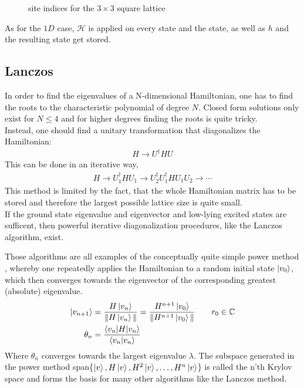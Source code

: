 \documentclass[a4paper,12pt]{article}
\begin{document}
\begin{figure}[htbp]
\centering
{}
\caption[]{\label{fig:1} site indices for the $3 \times 3$ square lattice}
\end{figure}
As for the $1D$ case, $\mathcal{H}$ is applied on every state and the
state, as well as $h$ and the resulting state get stored.



\subsection{Lanczos}

In order to find the eigenvalues of a N-dimensional Hamiltonian, one
has to find the roots to the characteristic polynomial of degree
$N$. Closed form solutions only exist for $ N\leq 4$ and for higher degrees
finding the roots is quite tricky.\\
Instead, one should find a unitary transformation that diagonalizes
the Hamiltonian:
\begin{align*}
H \to U^{\dagger} H U
\end{align*}
This can be done in an iterative way,
\begin{align*}
H \to U_1^{\dagger} H U_1 \to U_2^{\dagger}U_1^{\dagger} H U_1U_2 \to \dotsm
\end{align*}
This method is limited by the fact, that the whole Hamiltonian matrix
has to be stored and therefore the largest possible lattice size is
quite small.\\
If the ground state eigenvalue and eigenvector and low-lying excited
states are sufficent, then powerful iterative diagonalization
procedures, like the Lanczos algorithm, exist.

Those algorithms are all examples of the conceptually quite simple
power method \cite{Noack},
whereby one repeatedly applies the Hamiltonian to a random initial
state $\ket{v_0}$, which then converges towards the eigenvector of the
corresponding greatest (absolute) eigenvalue.
\begin{align*}
\ket{v_{n+1}} &= \frac{H \ket{v_n}}{\| H \ket{v_n} \|} =\frac{H^{n+1} \ket{v_0}}{\| H^{n+1} \ket{v_0} \|}  \qquad r_0 \in \mathbb{C}\\
\theta_n &= \frac{\braket{v_n|H|v_n}}{\braket{v_n|v_n}}
\end{align*}
Where $\theta_n$ converges towards the largest eigenvalue $\lambda$. The
subspace generated in the power method
 span\{$\ket{v},H \ket{v}, H^2 \ket{v}, \dotsc,H^n \ket{v}$\} 
is called the n'th Krylov space and forms the basis for many other
algorithms like the Lanczos method.
\end{document}
